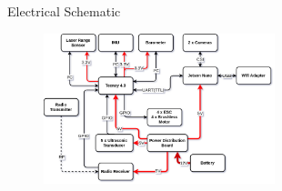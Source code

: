 \begin{frame}{Electrical Schematic}
            \begin{figure}
                \centering
                \includegraphics[width=0.6\textwidth]{img/esquematico.png}
                \label{fig:esquematico}
            \end{figure}

\end{frame}

